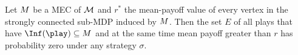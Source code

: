 \begin{lemma}
		\label{5-lem:MEC-stable}
	Let $M$ be a MEC of $\mathcal{M}$ and $r^*$ the mean-payoff value of every vertex in the strongly connected sub-MDP induced by $M$. Then the set $E$ of all plays that have $\Inf(\play)\subseteq\mec$ and at the same time mean payoff greater than $r$ has probability zero under any strategy $\sigma$.
\end{lemma}
